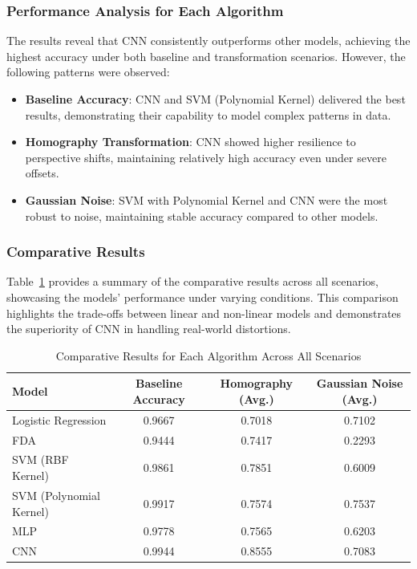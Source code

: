 \documentclass{article}
\begin{document}
\subsubsection{Performance Analysis for Each Algorithm}
The results reveal that CNN consistently outperforms other models, achieving the highest accuracy under both baseline and transformation scenarios. However, the following patterns were observed:
\begin{itemize}
    \item \textbf{Baseline Accuracy}: CNN and SVM (Polynomial Kernel) delivered the best results, demonstrating their capability to model complex patterns in data.
    \item \textbf{Homography Transformation}: CNN showed higher resilience to perspective shifts, maintaining relatively high accuracy even under severe offsets.
    \item \textbf{Gaussian Noise}: SVM with Polynomial Kernel and CNN were the most robust to noise, maintaining stable accuracy compared to other models.
\end{itemize}

\subsubsection{Comparative Results}
Table~\ref{tab:comparison} provides a summary of the comparative results across all scenarios, showcasing the models' performance under varying conditions. This comparison highlights the trade-offs between linear and non-linear models and demonstrates the superiority of CNN in handling real-world distortions.

\begin{table}[h!]
    \centering
    \caption{Comparative Results for Each Algorithm Across All Scenarios}
    \label{tab:comparison}
    \begin{tabular}{|l|c|c|c|}
        \hline
        \textbf{Model} & \textbf{Baseline Accuracy} & \textbf{Homography (Avg.)} & \textbf{Gaussian Noise (Avg.)} \\
        \hline
        Logistic Regression & 0.9667 & 0.7018 & 0.7102 \\
        FDA & 0.9444 & 0.7417 & 0.2293 \\
        SVM (RBF Kernel) & 0.9861 & 0.7851 & 0.6009 \\
        SVM (Polynomial Kernel) & 0.9917 & 0.7574 & 0.7537 \\
        MLP & 0.9778 & 0.7565 & 0.6203 \\
        CNN & 0.9944 & 0.8555 & 0.7083 \\
        \hline
    \end{tabular}
\end{table}
\end{document}
